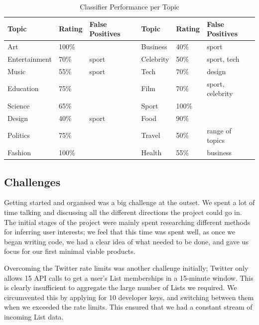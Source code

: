 \documentclass[11pt]{article}
\begin{document}
\begin{table}[h]
\centering
\caption{Classifier Performance per Topic}
\label{classifier_performance}
\begin{tabu} to 0.5
\toprule
Topic         & Rating &False Positives & Topic     & Rating &False Positives \\ \midrule
Art           & 100\%  &                             & Business  & 40\%   & sport                       \\
Entertainment & 70\%   & sport                       & Celebrity & 50\%   & sport, tech                 \\
Music         & 55\%   & sport                       & Tech      & 70\%   & design                      \\
Education     & 75\%   &                             & Film      & 70\%   & sport, celebrity            \\
Science       & 65\%   &                             & Sport     & 100\%  &                             \\
Design        & 40\%   & sport                       & Food      & 90\%   &                             \\
Politics      & 75\%   &                             & Travel    & 50\%   & range of topics             \\
Fashion       & 100\%  &                             & Health    & 55\%   & business                    \\ \bottomrule
\end{tabu}
\end{table}


\subsection{Challenges}
Getting started and organised was a big challenge at the outset. We spent a lot of time talking and discussing all the different directions the project could go in. The initial stages of the project were mainly spent researching different methods for inferring user interests; we feel that this time was spent well, as once we began writing code, we had a clear idea of what needed to be done, and gave us focus for our first minimal viable products.

Overcoming the Twitter rate limits was another challenge initially; Twitter only allows 15 API calls to get a user's List memberships in a 15-minute window. This is clearly insufficient to aggregate the large number of Lists we required. We circumvented this by applying for 10 developer keys, and switching between them when we exceeded the rate limits. This ensured that we had a constant stream of incoming List data. 
\end{document}
